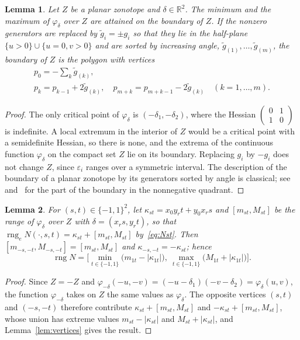 \documentclass[10pt]{article}
\newtheorem{lemma}{Lemma}
\theoremstyle{definition}
\newcommand{\R}{\mathbb{R}}
\newcommand{\eps}{\varepsilon}
\newcommand{\rng}{\operatorname{rng}}
\begin{document}
\begin{lemma}
\label{lem:zonotope}
Let $Z$ be a planar zonotope and $\delta\in\R^2$. The minimum and the maximum of $\varphi_\delta$ over $Z$ are attained on the boundary of $Z$. If the nonzero generators are replaced by $\tilde g_i=\pm g_i$ so that they lie in the half-plane $\{u>0\}\cup\{u=0,v>0\}$ and are sorted by increasing angle, $\tilde g_{(1)},\dots,\tilde g_{(m)}$, the boundary of $Z$ is the polygon with vertices
\begin{equation}
\label{eq:boundary}
\begin{gathered}p_0=-\sum_k\tilde g_{(k)},\\ p_k = p_{k-1}+2\tilde g_{(k)},\quad p_{m+k} = p_{m+k-1}-2\tilde g_{(k)}\quad (k=1,\dots,m).\end{gathered}
\end{equation}
\end{lemma}
\begin{proof}
The only critical point of $\varphi_\delta$ is $(-\delta_1,-\delta_2)$, where the Hessian $\left(\begin{smallmatrix}0&1\\1&0\end{smallmatrix}\right)$ is indefinite. A local extremum in the interior of $Z$ would be a critical point with a semidefinite Hessian, so there is none, and the extrema of the continuous function $\varphi_\delta$ on the compact set $Z$ lie on its boundary. Replacing $g_i$ by $-g_i$ does not change $Z$, since $\eps_i$ ranges over a symmetric interval. The description of the boundary of a planar zonotope by its generators sorted by angle is classical; see~\cite{ziegler1995lectures} and~\cite[Prop.~7]{skalna2017new} for the part of the boundary in the nonnegative quadrant.
\end{proof}

\begin{lemma}
\label{lem:pairs}
For $(s,t)\in\{-1,1\}^2$, let $\kappa_{st}=x_0y_rt+y_0x_rs$ and $[m_{st},M_{st}]$ be the range of $\varphi_\delta$ over $Z$ with $\delta=(x_rs,y_rt)$, so that $\rng_eN(\cdot,s,t)=\kappa_{st}+[m_{st},M_{st}]$ by~\eqref{eq:Nst}. Then $[m_{-s,-t},M_{-s,-t}]=[m_{st},M_{st}]$ and $\kappa_{-s,-t}=-\kappa_{st}$; hence
\[
\rng N=\Big[\min_{t\in\{-1,1\}}\big(m_{1t}-|\kappa_{1t}|\big),\ \max_{t\in\{-1,1\}}\big(M_{1t}+|\kappa_{1t}|\big)\Big].
\]
\end{lemma}
\begin{proof}
Since $Z=-Z$ and $\varphi_{-\delta}(-u,-v)=(-u-\delta_1)(-v-\delta_2)=\varphi_\delta(u,v)$, the function $\varphi_{-\delta}$ takes on $Z$ the same values as $\varphi_\delta$. The opposite vertices $(s,t)$ and $(-s,-t)$ therefore contribute $\kappa_{st}+[m_{st},M_{st}]$ and $-\kappa_{st}+[m_{st},M_{st}]$, whose union has extreme values $m_{st}-|\kappa_{st}|$ and $M_{st}+|\kappa_{st}|$, and Lemma~\ref{lem:vertices} gives the result.
\end{proof}
\end{document}
